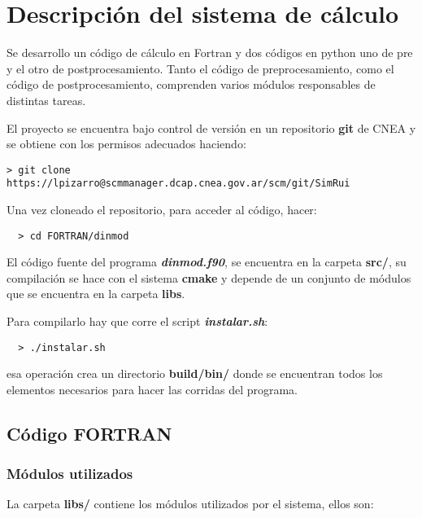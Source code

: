 

\section{Descripci\'on del sistema de c\'alculo}


Se desarrollo un c\'odigo de c\'alculo en Fortran y dos c\'odigos
en python uno  de pre y el otro de postprocesamiento. Tanto el código de 
preprocesamiento, 
como el código de postprocesamiento, comprenden varios módulos responsables de distintas
tareas.

El proyecto se encuentra bajo control de versión en un repositorio \textbf{git} de CNEA
y se obtiene con los permisos adecuados haciendo:

\begin{verbatim}
> git clone https://lpizarro@scmmanager.dcap.cnea.gov.ar/scm/git/SimRui
\end{verbatim}

Una vez cloneado el repositorio, para acceder al código, hacer:

\begin{verbatim}
  > cd FORTRAN/dinmod
\end{verbatim}

El c\'odigo fuente del programa \textbf{\textit{dinmod.f90}}, se encuentra en la carpeta
\textbf{src/}, su compilación se hace con el sistema \textbf{cmake} y depende
de un conjunto de módulos que se encuentra en la carpeta \textbf{libs}.

Para compilarlo hay que corre el script \textbf{\textit{instalar.sh}}:

\begin{verbatim}
  > ./instalar.sh 
\end{verbatim}

esa operación crea un directorio  \textbf{build/bin/} donde se encuentran todos
los elementos necesarios para hacer las corridas del programa.

\subsection{Código FORTRAN}

\subsubsection{Módulos  utilizados}

La carpeta \textbf{libs/} contiene los módulos utilizados por el sistema, ellos son:

